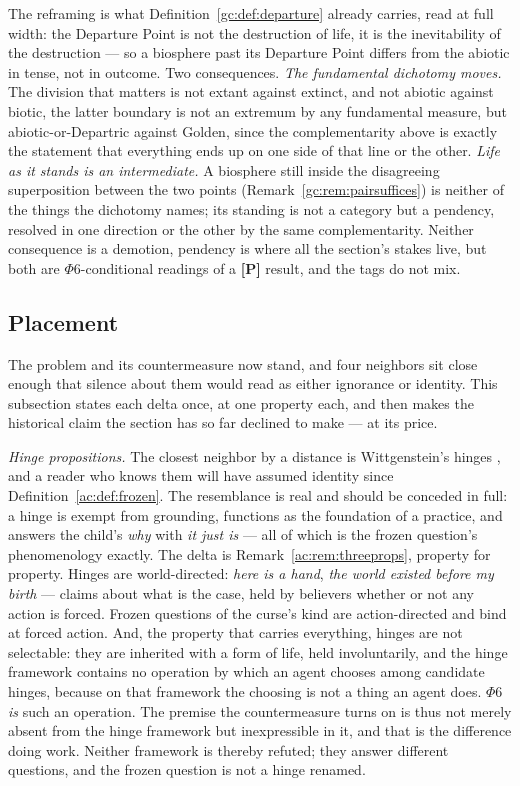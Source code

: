 \documentclass[11pt]{article}
\numberwithin{equation}{section}
\theoremstyle{plain}
\theoremstyle{definition}
\theoremstyle{remark}
\begin{document}
The reframing is what Definition~\ref{gc:def:departure} already carries, read at full width: the Departure Point is not the destruction of life, it is the inevitability of the destruction --- so a biosphere past its Departure Point differs from the abiotic in tense, not in outcome. Two consequences. \emph{The fundamental dichotomy moves.} The division that matters is not extant against extinct, and not abiotic against biotic, the latter boundary is not an extremum by any fundamental measure, but abiotic-or-Departric against Golden, since the complementarity above is exactly the statement that everything ends up on one side of that line or the other. \emph{Life as it stands is an intermediate.} A biosphere still inside the disagreeing superposition between the two points (Remark~\ref{gc:rem:pairsuffices}) is neither of the things the dichotomy names; its standing is not a category but a pendency, resolved in one direction or the other by the same complementarity. Neither consequence is a demotion, pendency is where all the section's stakes live, but both are $\Phi6$-conditional readings of a \textbf{[P]} result, and the tags do not mix.

\subsection{Placement}\label{ac:sub:placement}

The problem and its countermeasure now stand, and four neighbors sit close enough that silence about them would read as either ignorance or identity. This subsection states each delta once, at one property each, and then makes the historical claim the section has so far declined to make --- at its price.

\emph{Hinge propositions.} The closest neighbor by a distance is Wittgenstein's hinges \cite{Wittgenstein69}, and a reader who knows them will have assumed identity since Definition~\ref{ac:def:frozen}. The resemblance is real and should be conceded in full: a hinge is exempt from grounding, functions as the foundation of a practice, and answers the child's \emph{why} with \emph{it just is} --- all of which is the frozen question's phenomenology exactly. The delta is Remark~\ref{ac:rem:threeprops}, property for property. Hinges are world-directed: \emph{here is a hand}, \emph{the world existed before my birth} --- claims about what is the case, held by believers whether or not any action is forced. Frozen questions of the curse's kind are action-directed and bind at forced action. And, the property that carries everything, hinges are not selectable: they are inherited with a form of life, held involuntarily, and the hinge framework contains no operation by which an agent chooses among candidate hinges, because on that framework the choosing is not a thing an agent does. $\Phi6$ \emph{is} such an operation. The premise the countermeasure turns on is thus not merely absent from the hinge framework but inexpressible in it, and that is the difference doing work. Neither framework is thereby refuted; they answer different questions, and the frozen question is not a hinge renamed.
\end{document}
